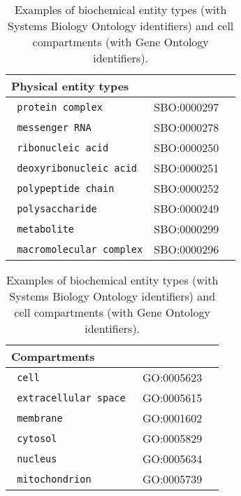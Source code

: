 \documentclass[a4paper]{article}
\newcommand{\defext}[1] {\texttt{\color{lightblue} #1}}
\begin{document}
\begin{appendix}
\begin{table}[h!]
  \begin{center}
{\small
  \begin{tabular}{|l|l|l|}
      \hline
      \textbf{Physical entity types} &             \\ \hline
      \defext{protein complex       }& SBO:0000297 \\
      \defext{messenger RNA         }& SBO:0000278 \\
      \defext{ribonucleic acid      }& SBO:0000250 \\
      \defext{deoxyribonucleic acid} & SBO:0000251 \\
      \defext{polypeptide chain     }& SBO:0000252 \\
      \defext{polysaccharide        }& SBO:0000249 \\
      \defext{metabolite            }& SBO:0000299 \\
      \defext{macromolecular complex}& SBO:0000296 \\
	  \hline
    \end{tabular}\hspace{5mm}
  \begin{tabular}{|l|l|l|}
      \hline
      \textbf{Compartments} &             \\ \hline
      \defext{cell }  & GO:0005623  \\
      \defext{extracellular space }  & GO:0005615  \\
      \defext{membrane            }  & GO:0001602  \\
      \defext{cytosol             }  & GO:0005829  \\
      \defext{nucleus             }  & GO:0005634  \\
      \defext{mitochondrion       }  & GO:0005739  \\  
      \hline
\hline
    \end{tabular}
}
  \end{center}
\caption{Examples of biochemical entity types (with Systems Biology Ontology identifiers) and 
cell compartments (with Gene Ontology identifiers).}
\label{tab:objects}
\end{table}
 
\end{appendix}
\end{document}
